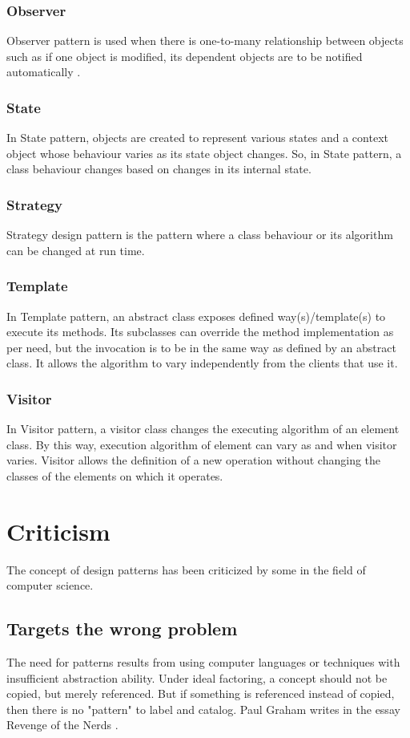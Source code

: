 \documentclass[sigplan,12pt,nonacm=true,review=false]{acmart}
\begin{document}
\subsubsection{Observer}
Observer pattern is used when there is one-to-many relationship between objects such as if one object is modified, its dependent objects are to be notified automatically \cite{wendorff_assessment_2001}. 

\subsubsection{State}
In State pattern, objects are created to represent various states and a context object whose behaviour varies as its state object changes. So, in State pattern, a class behaviour changes based on changes in its internal state. 

\subsubsection{Strategy}
Strategy design pattern is the pattern where a class behaviour or its algorithm can be changed at run time. 

\subsubsection{Template}
In Template pattern, an abstract class exposes defined way(s)/template(s) to execute its methods. Its subclasses can override the method implementation as per need, but the invocation is to be in the same way as defined by an abstract class. It allows the algorithm to vary independently from the clients that use it. 

\subsubsection{Visitor}
In Visitor pattern, a visitor class changes the executing algorithm of an element class. By this way, execution algorithm of element can vary as and when visitor varies. Visitor allows the definition of a new operation without changing the classes of the elements on which it operates.


\section{Criticism}
The concept of design patterns has been criticized by some in the field of computer science.

\subsection{Targets the wrong problem}
The need for patterns results from using computer languages or techniques with insufficient abstraction ability. Under ideal factoring, a concept should not be copied, but merely referenced. But if something is referenced instead of copied, then there is no "pattern" to label and catalog. Paul Graham writes in the essay Revenge of the Nerds \cite{noauthor_design_nodate}.
\end{document}
